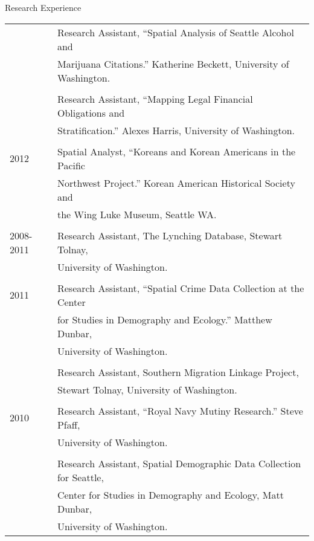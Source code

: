 \documentclass{resume} %
\begin{document}
\begin{rSection}{Research Experience}
\begin{tabular}{ @{} >{}l @{\hspace{6ex}} l }
	 		& Research Assistant, ``Spatial Analysis of Seattle Alcohol and\\
			& Marijuana Citations.'' Katherine Beckett, University of Washington.\\\\

			& Research Assistant, ``Mapping Legal Financial Obligations and\\
			& Stratification.'' Alexes Harris, University of Washington.\\\\

2012		& Spatial Analyst, ``Koreans and Korean Americans in the Pacific\\
			& Northwest Project.'' Korean American Historical Society and\\
			& the Wing Luke Museum, Seattle WA.\\\\

2008-2011 	& Research Assistant, The Lynching Database, Stewart Tolnay,\\
			& University of Washington.\\\\

2011		& Research Assistant, ``Spatial Crime Data Collection at the Center\\
			& for Studies in Demography and Ecology.'' Matthew Dunbar,\\
			& University of Washington.\\\\

	 		& Research Assistant, Southern Migration Linkage Project,\\
			& Stewart Tolnay, University of Washington.\\\\

2010 		& Research Assistant, ``Royal Navy Mutiny Research.'' Steve Pfaff,\\
			& University of Washington.\\\\

	 		& Research Assistant, Spatial Demographic Data Collection for Seattle,\\
			&  Center for Studies in Demography and Ecology, Matt Dunbar, \\
			& University of Washington.

\end{tabular}
\vspace{5mm}
\end{rSection}
\end{document}
